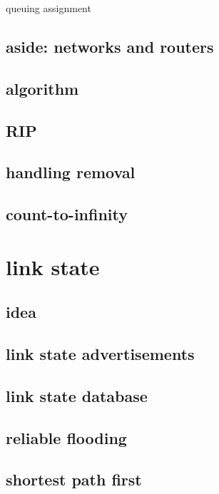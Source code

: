 \begin{frame}{queuing assignment}
\subsection{aside: networks and routers}
 

\subsection{algorithm}


\subsection{RIP}



\subsection{handling removal}

\subsection{count-to-infinity}

\section{link state}
\subsection{idea}

\subsection{link state advertisements}

\subsection{link state database}

\subsection{reliable flooding}


\subsection{shortest path first}



\end{frame}
